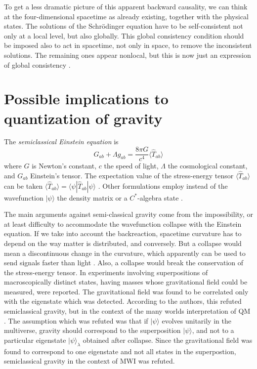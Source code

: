 \documentclass[12pt]{amsart}
\theoremstyle{definition}
\theoremstyle{plain}
\begin{document}
To get a less dramatic picture of this apparent backward causality, we can think at the four-dimensional spacetime as already existing, together with the physical states. The solutions of the Schr\"odinger equation have to be self-consistent not only at a local level, but also globally. This global consistency condition should be imposed also to act in spacetime, not only in space, to remove the inconsistent solutions. The remaining ones appear nonlocal, but this is now just an expression of global consistency \cite{Sto12QMc,Sto13bSpringer}.


\section{Possible implications to quantization of gravity}
\label{s:quantum_gravity}

The \emph{semiclassical Einstein equation} is
\begin{equation}
\label{eq:einstein_semiclassical}
G_{ab} + \Lambda g_{ab} = \frac{8\pi G}{c^4} \langle \hat T_{ab} \rangle
\end{equation}
where $G$ is Newton's constant, $c$ the speed of light, $\Lambda$ the cosmological constant, and $G_{ab}$ Einstein's tensor. The expectation value of the stress-energy tensor $\langle \hat T_{ab} \rangle$ can be taken $\langle \hat T_{ab} \rangle=\langle{\psi}|\hat T_{ab}|{\psi}\rangle$ \cite{Moller1962EnergyMomentumQuantum,Rosenfeld1963QuantizationFields}. Other formulations employ instead of the wavefunction $|{\psi}\rangle$ the density matrix or a $C^\ast$-algebra state \cite{Wal94}.


The main arguments against semi-classical gravity come from the impossibility, or at least difficulty to accommodate the wavefunction collapse with the Einstein equation. If we take into account the backreaction, spacetime curvature has to depend on the way matter is distributed, and conversely. But a collapse would mean a discontinuous change in the curvature, which apparently can be used to send signals faster than light \cite{EppleyHannah1977NecessityQuantizeGravitationalField}. Also, a collapse would break the conservation of the stress-energy tensor. In \cite{PageGeilker1981IndirectEvidenceQM} experiments involving superpositions of macroscopically distinct states, having masses whose gravitational field could be measured, were reported. The gravitational field was found to be correlated only with the eigenstate which was detected. According to the authors, this refuted semiclassical gravity, but in the context of the many worlds interpretation of QM \cite{Eve57,Eve73}. The assumption which was refuted was that if $|{\psi}\rangle$ evolves unitarily in the multiverse, gravity should correspond to the superposition $|{\psi}\rangle$, and not to a particular eigenstate $|{\psi}\rangle_\lambda$ obtained after collapse. Since the gravitational field was found to correspond to one eigenstate and not all states in the superpostion, semiclassical gravity in the context of MWI was refuted.
\end{document}
